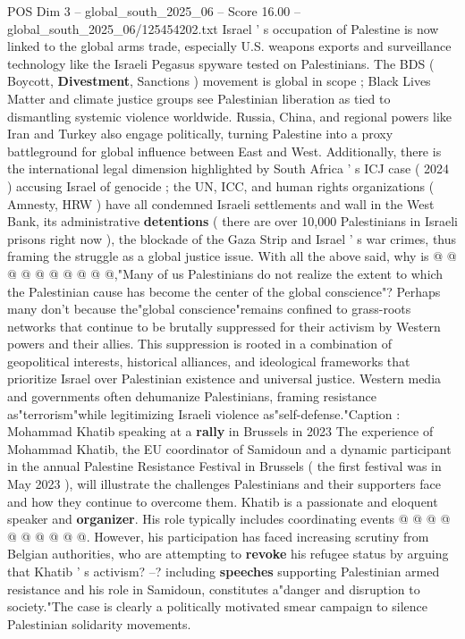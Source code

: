 \begin{textsample}{POS Dim 3 – global\_south\_2025\_06 – Score 16.00 – global\_south\_2025\_06/125454202.txt}  \label{ex:f3_pos_195}
Israel ' s occupation of Palestine is now linked to the global arms trade, especially U.S. weapons exports and surveillance technology like the Israeli Pegasus spyware tested on Palestinians.
The BDS ( Boycott, \textbf{Divestment}, Sanctions ) movement is global in scope ; Black Lives Matter and climate justice groups see Palestinian liberation as tied to dismantling systemic violence worldwide.
Russia, China, and regional powers like Iran and Turkey also engage politically, turning Palestine into a proxy battleground for global influence between East and West.
Additionally, there is the international legal dimension highlighted by South Africa ' s ICJ case ( 2024 ) accusing Israel of genocide ; the UN, ICC, and human rights organizations ( Amnesty, HRW ) have all condemned Israeli settlements and wall in the West Bank, its administrative \textbf{detentions} ( there are over 10,000 Palestinians in Israeli prisons right now ), the blockade of the Gaza Strip and Israel ' s war crimes, thus framing the struggle as a global justice issue.
With all the above said, why is @ @ @ @ @ @ @ @ @ @,"Many of us Palestinians do not realize the extent to which the Palestinian cause has become the center of the global conscience"?
Perhaps many don't because the"global conscience"remains confined to grass-roots networks that continue to be brutally suppressed for their activism by Western powers and their allies.
This suppression is rooted in a combination of geopolitical interests, historical alliances, and ideological frameworks that prioritize Israel over Palestinian existence and universal justice.
Western media and governments often dehumanize Palestinians, framing resistance as"terrorism"while legitimizing Israeli violence as"self-defense."Caption : Mohammad Khatib speaking at a \textbf{rally} in Brussels in 2023 The experience of Mohammad Khatib, the EU coordinator of Samidoun and a dynamic participant in the annual Palestine Resistance Festival in Brussels ( the first festival was in May 2023 ), will illustrate the challenges Palestinians and their supporters face and how they continue to overcome them.
Khatib is a passionate and eloquent speaker and \textbf{organizer}.
His role typically includes coordinating events @ @ @ @ @ @ @ @ @ @.
However, his participation has faced increasing scrutiny from Belgian authorities, who are attempting to \textbf{revoke} his refugee status by arguing that Khatib ' s activism? --? including \textbf{speeches} supporting Palestinian armed resistance and his role in Samidoun, constitutes a"danger and disruption to society."The case is clearly a politically motivated smear campaign to silence Palestinian solidarity movements.

\end{textsample}
